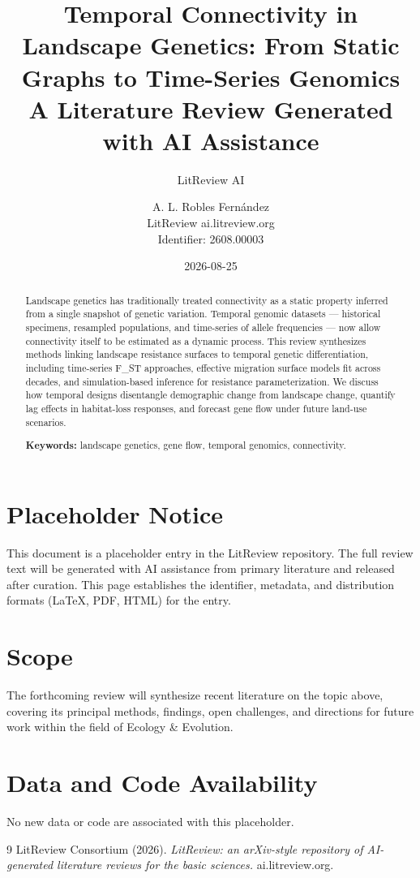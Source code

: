 \documentclass[11pt]{article}
\title{Temporal Connectivity in Landscape Genetics: From Static Graphs to Time-Series Genomics\\
\large A Literature Review Generated with AI Assistance}
\author{LitReview AI \and A. L. Robles Fernández\\[4pt]
\small LitReview \textbar{} ai.litreview.org\\
\small Identifier: 2608.00003}
\date{2026-08-25}
\begin{document}
\maketitle

\begin{abstract}
Landscape genetics has traditionally treated connectivity as a static property inferred from a single snapshot of genetic variation. Temporal genomic datasets — historical specimens, resampled populations, and time-series of allele frequencies — now allow connectivity itself to be estimated as a dynamic process. This review synthesizes methods linking landscape resistance surfaces to temporal genetic differentiation, including time-series F_ST approaches, effective migration surface models fit across decades, and simulation-based inference for resistance parameterization. We discuss how temporal designs disentangle demographic change from landscape change, quantify lag effects in habitat-loss responses, and forecast gene flow under future land-use scenarios.

\noindent\textbf{Keywords:} landscape genetics, gene flow, temporal genomics, connectivity.
\end{abstract}

\section*{Placeholder Notice}
This document is a placeholder entry in the LitReview repository. The full
review text will be generated with AI assistance from primary literature and
released after curation. This page establishes the identifier, metadata, and
distribution formats (LaTeX, PDF, HTML) for the entry.

\section*{Scope}
The forthcoming review will synthesize recent literature on the topic above,
covering its principal methods, findings, open challenges, and directions for
future work within the field of Ecology \& Evolution.

\section*{Data and Code Availability}
No new data or code are associated with this placeholder.


\begin{thebibliography}{9}
 LitReview Consortium (2026). \emph{LitReview: an arXiv-style repository of AI-generated literature reviews for the basic sciences.} ai.litreview.org.
\end{thebibliography}
\end{document}

